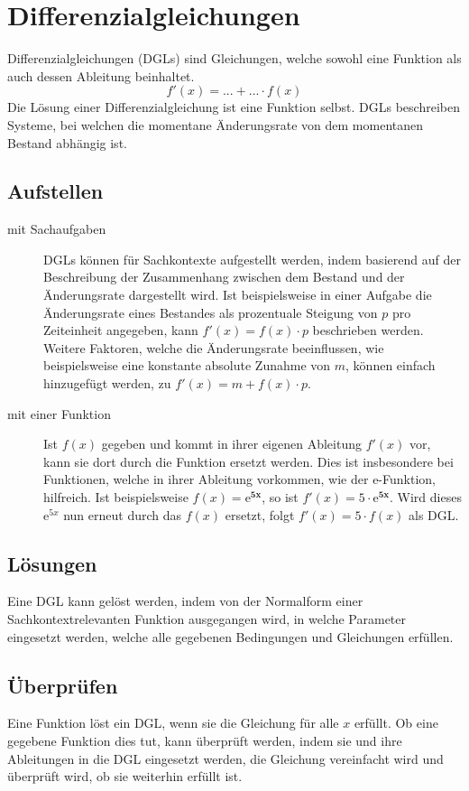 \documentclass{article}
\begin{document}
\section{Differenzialgleichungen} 
Differenzialgleichungen (DGLs) sind Gleichungen, welche sowohl eine Funktion als auch dessen Ableitung beinhaltet.
\[
 f'(x) = ... + ... \cdot f(x)
\]
Die Lösung einer Differenzialgleichung ist eine Funktion selbst. DGLs beschreiben Systeme, bei welchen die momentane Änderungsrate von dem momentanen Bestand abhängig ist.
 
\subsection{Aufstellen}
\begin{description}
 \item[mit Sachaufgaben] DGLs können für Sachkontexte aufgestellt werden, indem basierend auf der Beschreibung der Zusammenhang zwischen dem Bestand und der Änderungsrate dargestellt wird. \newline
Ist beispielsweise in einer Aufgabe die Änderungsrate eines Bestandes als prozentuale Steigung von $p$ pro Zeiteinheit angegeben, kann $f'(x) = f(x) \cdot p$ beschrieben werden. Weitere Faktoren, welche die Änderungsrate beeinflussen, wie beispielsweise eine konstante absolute Zunahme von $m$, können einfach hinzugefügt werden, zu $f'(x)=m + f(x) \cdot p$.
 \item[mit einer Funktion] Ist $f(x)$ gegeben und kommt in ihrer eigenen Ableitung $f'(x)$ vor, kann sie dort durch die Funktion ersetzt werden. Dies ist insbesondere bei Funktionen, welche in ihrer Ableitung vorkommen, wie der e-Funktion, hilfreich. \newline
Ist beispielsweise $f(x)=\mathbf{\mathrm{e}^{5x}}$, so ist $f'(x)=5 \cdot \mathbf{\mathrm{e}^{5x}}$. Wird dieses $\mathrm{e}^{5x}$ nun erneut durch das $f(x)$ ersetzt, folgt $f'(x)=5 \cdot f(x)$ als DGL.
\end{description}
 
\subsection{Lösungen}
Eine DGL kann gelöst werden, indem von der Normalform einer Sachkontextrelevanten Funktion ausgegangen wird, in welche Parameter eingesetzt werden, welche alle gegebenen Bedingungen und Gleichungen erfüllen. 
\subsection{Überprüfen} 
Eine Funktion löst ein DGL, wenn sie die Gleichung für alle $x$ erfüllt. 
Ob eine gegebene Funktion dies tut, kann überprüft werden, indem sie und ihre Ableitungen in die DGL eingesetzt werden, die Gleichung vereinfacht wird und überprüft wird, ob sie weiterhin erfüllt ist.
\end{document}

